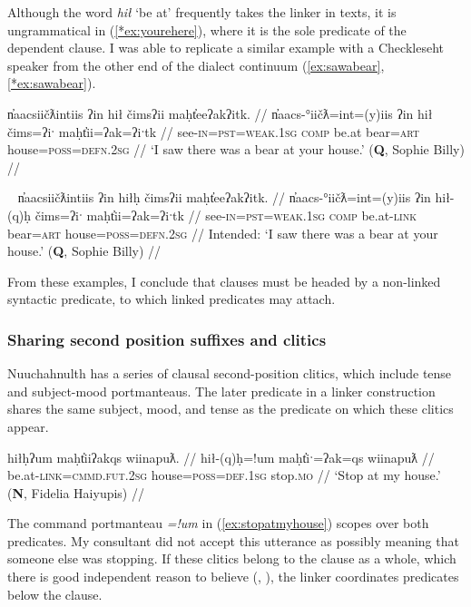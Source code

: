 Although the word \textit{hił} `be at' frequently takes the linker in texts, it is ungrammatical in (\ref{*ex:yourehere}), where it is the sole predicate of the dependent clause. I was able to replicate a similar example with a Checkleseht speaker from the other end of the dialect continuum (\ref{ex:sawabear}, \ref{*ex:sawabear}).

\ex \label{ex:sawabear}
\begingl
\glpreamble n̓aacsiičƛintiis ʔin hił čimsʔii maḥt̓eeʔakʔitk. //
\gla n̓aacs-°iičƛ=int=(y)iis ʔin hił čims=ʔiˑ maḥt̓ii=ʔak=ʔiˑtk //
\glb see-\textsc{in}=\textsc{pst}=\textsc{weak.1sg} \textsc{comp} be.at bear=\textsc{art} house=\textsc{poss}=\textsc{defn.2sg} //
\glft `I saw there was a bear at your house.' (\textbf{Q}, Sophie Billy) //
\endgl
\xe

\ex~ \label{*ex:sawabear}
\begingl
\glpreamble *n̓aacsiičƛintiis ʔin hiłḥ čimsʔii maḥt̓eeʔakʔitk. //
\gla n̓aacs-°iičƛ=int=(y)iis ʔin hił-(q)ḥ čims=ʔiˑ maḥt̓ii=ʔak=ʔiˑtk //
\glb see-\textsc{in}=\textsc{pst}=\textsc{weak.1sg} \textsc{comp} be.at-\textsc{link} bear=\textsc{art} house=\textsc{poss}=\textsc{defn.2sg} //
\glft Intended: `I saw there was a bear at your house.' (\textbf{Q}, Sophie Billy) //
\endgl
\xe

From these examples, I conclude that clauses must be headed by a non-linked syntactic predicate, to which linked predicates may attach.

\subsubsection{Sharing second position suffixes and clitics} \label{sec:link:second}

Nuuchahnulth has a series of clausal second-position clitics, which include tense and subject-mood portmanteaus. The later predicate in a linker construction shares the same subject, mood, and tense as the predicate on which these clitics appear.

\ex \label{ex:stopatmyhouse}
\begingl
\glpreamble hiłḥʔum maḥt̓iiʔakqs wiinapuƛ. //
\gla hił-(q)ḥ=!um maḥt̓iˑ=ʔak=qs wiinapuƛ //
\glb be.at-\textsc{link}=\textsc{cmmd.fut.2sg} house=\textsc{poss}=\textsc{def.1sg} stop.\textsc{mo} //
\glft `Stop at my house.' (\textbf{N}, Fidelia Haiyupis) //
\endgl
\xe

The command portmanteau \textit{=!um} in (\ref{ex:stopatmyhouse}) scopes over both predicates. My consultant did not accept this utterance as possibly meaning that someone else was stopping. If these clitics belong to the clause as a whole, which there is good independent reason to believe (\citealt[35--36]{rose1981}, \citealt[42--50]{woo2007b}), the linker coordinates predicates below the clause.


